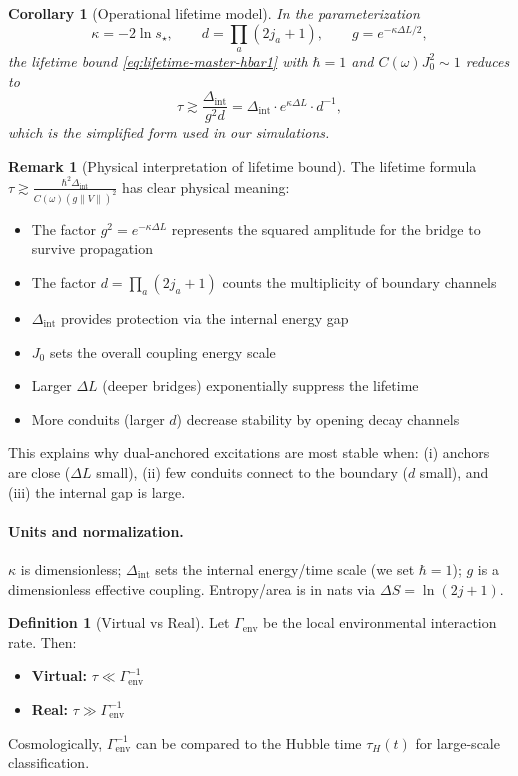\documentclass[11pt]{article}
\theoremstyle{plain}
\newtheorem{corollary}[theorem]{Corollary}
\theoremstyle{definition}
\newtheorem{definition}[theorem]{Definition}
\newtheorem{remark}[theorem]{Remark}
\begin{document}
\begin{corollary}[Operational lifetime model]\label{cor:operational-lifetime}
  In the parameterization
  \[
    \kappa = -2\ln s_\star,\qquad d=\prod_a (2j_a+1),\qquad g=e^{-\kappa \Delta L/2},
  \]
  the lifetime bound \eqref{eq:lifetime-master-hbar1} with $\hbar=1$ and $C(\omega)J_0^2 \sim 1$ reduces to
  \[
    \tau \gtrsim \frac{\Delta_{\mathrm{int}}}{g^2 d} = \Delta_{\mathrm{int}} \cdot e^{\kappa \Delta L} \cdot d^{-1},
  \]
  which is the simplified form used in our simulations.
\end{corollary}

\begin{remark}[Physical interpretation of lifetime bound]
  The lifetime formula $\tau \gtrsim \frac{\hbar^2 \Delta_{\mathrm{int}}}{C(\omega)(g\|V\|)^2}$ has clear physical meaning:
  \begin{itemize}
    \item The factor $g^2 = e^{-\kappa \Delta L}$ represents the squared amplitude for the bridge to survive propagation
    \item The factor $d = \prod_a(2j_a+1)$ counts the multiplicity of boundary channels
    \item $\Delta_{\mathrm{int}}$ provides protection via the internal energy gap
    \item $J_0$ sets the overall coupling energy scale
    \item Larger $\Delta L$ (deeper bridges) exponentially suppress the lifetime
    \item More conduits (larger $d$) decrease stability by opening decay channels
  \end{itemize}
  This explains why dual-anchored excitations are most stable when: (i) anchors are close ($\Delta L$ small), (ii) few conduits connect to the boundary ($d$ small), and (iii) the internal gap is large.
\end{remark}

\paragraph{Units and normalization.}
$\kappa$ is dimensionless; $\Delta_{\mathrm{int}}$ sets the internal energy/time scale (we set $\hbar=1$); $g$ is a dimensionless effective coupling. Entropy/area is in nats via $\Delta S=\ln(2j+1)$.

\begin{definition}[Virtual vs Real]
  Let $\Gamma_{\mathrm{env}}$ be the local environmental interaction rate. Then:
  \begin{itemize}
    \item \textbf{Virtual:} $\tau \ll \Gamma_{\mathrm{env}}^{-1}$
    \item \textbf{Real:} $\tau \gg \Gamma_{\mathrm{env}}^{-1}$
  \end{itemize}
  Cosmologically, $\Gamma_{\mathrm{env}}^{-1}$ can be compared to the Hubble time $\tau_H(t)$ for large-scale classification.
\end{definition}
\end{document}

